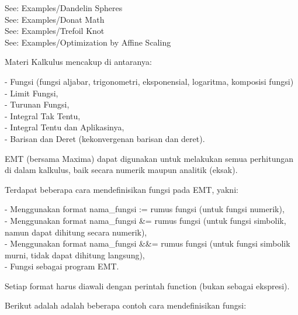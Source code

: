 \documentclass[a4paper,10pt]{article}
\begin{document}
\begin{eulernotebook}
\begin{eulercomment}
See: Examples/Dandelin Spheres\\
See: Examples/Donat Math\\
See: Examples/Trefoil Knot\\
See: Examples/Optimization by Affine Scaling
\end{eulercomment}
\begin{eulercomment}





\end{eulercomment}
\eulersubheading{}
\eulersubheading{}
\eulersubheading{}
\begin{eulercomment}



\end{eulercomment}
\begin{eulercomment}
Materi Kalkulus mencakup di antaranya:

- Fungsi (fungsi aljabar, trigonometri, eksponensial, logaritma,
komposisi fungsi)\\
- Limit Fungsi,\\
- Turunan Fungsi,\\
- Integral Tak Tentu,\\
- Integral Tentu dan Aplikasinya,\\
- Barisan dan Deret (kekonvergenan barisan dan deret).

EMT (bersama Maxima) dapat digunakan untuk melakukan semua perhitungan
di dalam kalkulus, baik secara numerik maupun analitik (eksak).

\end{eulercomment}
\begin{eulercomment}
Terdapat beberapa cara mendefinisikan fungsi pada EMT, yakni:

- Menggunakan format nama\_fungsi := rumus fungsi (untuk fungsi
numerik),\\
- Menggunakan format nama\_fungsi \&= rumus fungsi (untuk fungsi
simbolik, namun dapat dihitung secara numerik),\\
- Menggunakan format nama\_fungsi \&\&= rumus fungsi (untuk fungsi
simbolik murni, tidak dapat dihitung langsung),\\
- Fungsi sebagai program EMT.

Setiap format harus diawali dengan perintah function (bukan sebagai
ekspresi).

Berikut adalah adalah beberapa contoh cara mendefinisikan fungsi:


\end{eulercomment}
\end{eulernotebook}
\end{document}
